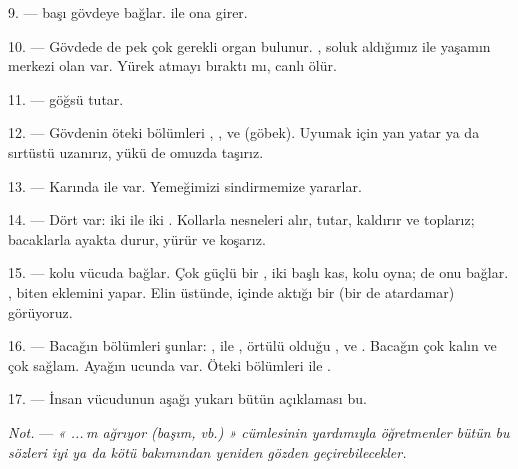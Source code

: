 \VUsaut{4.4mm}
\VUsaut{3.0mm}

9. ---  başı gövdeye bağlar.  ile 
ona girer.

10. --- Gövdede de pek çok gerekli organ bulunur. , soluk
aldığımız  ile yaşamın merkezi olan  var.
Yürek atmayı bıraktı mı, canlı ölür.

11. ---  göğsü tutar.

12. --- Gövdenin öteki bölümleri , ,
 ve  (göbek). Uyumak için yan yatar ya da
sırtüstü uzanırız, yükü de omuzda taşırız.

13. --- Karında  ile  var. Yemeğimizi
sindirmemize yararlar.

\VUsaut{4.4mm}
\VUsaut{3.0mm}

14. --- Dört  var: iki  ile iki
. Kollarla nesneleri alır, tutar, kaldırır ve toplarız;
bacaklarla ayakta durur, yürür ve koşarız.

15. ---  kolu vücuda bağlar. Çok güçlü bir , iki
başlı kas, kolu oyna;  de onu  bağlar.
,   biten
 eklemini yapar. Elin üstünde, içinde  aktığı bir
 (bir de atardamar) görüyoruz.

16. --- Bacağın bölümleri şunlar: ,  ile
,   örtülü olduğu
,  ve . Bacağın
 çok kalın ve çok sağlam. Ayağın ucunda  var. Öteki bölümleri  ile .

17. --- İnsan vücudunun aşağı yukarı bütün açıklaması bu.

\textit{Not.} --- \textit{« ...\,m ağrıyor (başım, vb.) » cümlesinin yardımıyla
öğretmenler bütün bu sözleri iyi ya da kötü} 
\textit{bakımından yeniden gözden geçirebilecekler.}

\VUsaut{5.0mm}
\VUsaut{2.4mm}
\VUsaut{3.0mm}

